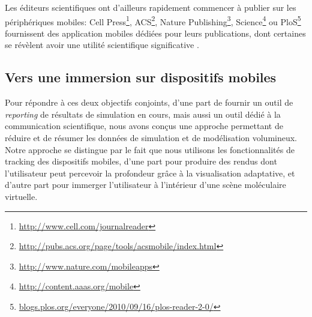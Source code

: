
Les éditeurs scientifiques ont d'ailleurs rapidement commencer à publier sur les périphériques mobiles: Cell Press\footnote{\url{http://www.cell.com/journalreader}}, ACS\footnote{\url{http://pubs.acs.org/page/tools/acsmobile/index.html}}, Nature Publishing\footnote{\url{http://www.nature.com/mobileapps}}, Science\footnote{\url{http://content.aaas.org/mobile}} ou PloS\footnote{\url{blogs.plos.org/everyone/2010/09/16/plos-reader-2-0/}} fournissent des application mobiles dédiées pour leurs publications, dont certaines se révèlent avoir une utilité scientifique significative \cite{powell_lab_2012}. %

\subsection{Vers une immersion sur dispositifs mobiles}

Pour répondre à ces deux objectifs conjoints, d'une part de fournir un outil de \textit{reporting} de résultats de simulation en cours, mais aussi un outil dédié à la communication scientifique, nous avons conçus une approche permettant de réduire et de résumer les données de simulation et de modélisation volumineux. Notre approche se distingue par le fait que nous utilisons les fonctionnalités de tracking des dispositifs mobiles, d'une part pour produire des rendus dont l'utilisateur peut percevoir la profondeur grâce à la visualisation adaptative, et d'autre part pour immerger  l'utilisateur à l'intérieur d'une scène moléculaire virtuelle.


